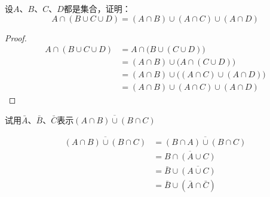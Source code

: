 \begin{example}
  设$A$、$B$、$C$、$D$都是集合，证明：
\[A\cap (B\cup C\cup D)=(A\cap B)\cup (A\cap C)\cup (A\cap D)\]
\end{example}

\begin{proof}
\begin{align*}
  A\cap (B\cup C\cup D)&= A\cap \big(B\cup(C\cup D)\big)  \tag{结合律}\\
  &=(A\cap B)\cup \big(A\cap (C\cup D)\big)  \tag{分配律}\\
  &=(A\cap B)\cup \big((A\cap C)\cup  (A\cap D)\big)\tag{分配律}\\
  &=(A\cap B)\cup (A\cap C)\cup  (A\cap D)  \tag{结合律}
\end{align*}
\end{proof}

\begin{example}
  试用$\bar A$、$\bar B$、$\bar C$表示$\overline{(A\cap B)\cup (B\cap C)}$
\end{example}


\begin{solution}
\begin{align*}
  \overline{(A\cap B)\cup (B\cap C)}&=\overline{(B\cap A)\cup (B\cap C)}  \tag{交换律}\\
  &=\overline{B\cap (A\cup C)} \tag{分配律}\\
  &=\bar B\cup \overline{(A\cup C)} \tag{德·摩根法则}\\
  &=\bar B\cup (\bar A\cap \bar C) \tag{德·摩根法则} 
\end{align*} 
\end{solution}
  


